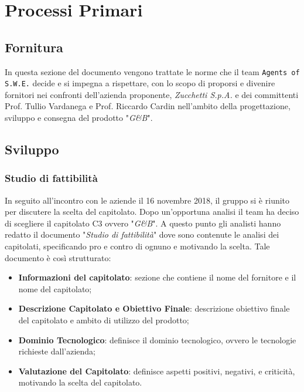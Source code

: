 \section{Processi Primari}\label{ProcessiPrimari}

\subsection{Fornitura}
In questa sezione del documento vengono trattate le norme che il team \texttt{Agents of S.W.E.} decide e si impegna a rispettare, con lo scopo di proporsi e divenire fornitori nei confronti dell'azienda proponente, \textit{Zucchetti S.p.A.} e dei committenti Prof. Tullio Vardanega e Prof. Riccardo Cardin nell'ambito della progettazione, sviluppo e consegna del prodotto "\textit{G\&B}". 

\subsection{Sviluppo}\label{Sviluppo}
\subsubsection{Studio di fattibilità} \label{ProcessiPrimari_Sviluppo_StudioFattibilità}
In seguito all'incontro con le aziende il 16 novembre 2018, il gruppo si è riunito per discutere la scelta del capitolato. Dopo un'opportuna analisi il team ha deciso di scegliere il capitolato C3 ovvero "\textit{G\&B}". A questo punto gli analisti hanno redatto il documento "\textit{Studio di fattibilità}" dove sono contenute le analisi dei capitolati, specificando pro e contro di ognuno e motivando la scelta.
Tale documento è così strutturato: 
\begin{itemize}
	\item \textbf{Informazioni del capitolato}: sezione che contiene il nome del fornitore e il nome del capitolato;
	\item \textbf{Descrizione Capitolato e Obiettivo Finale}: descrizione obiettivo finale del capitolato e ambito di utilizzo del prodotto;
	\item \textbf{Dominio Tecnologico}: definisce il dominio tecnologico, ovvero le tecnologie richieste dall'azienda;
	\item \textbf{Valutazione del Capitolato}: definisce aspetti positivi, negativi, e criticità, motivando la scelta del capitolato.  
\end{itemize}

